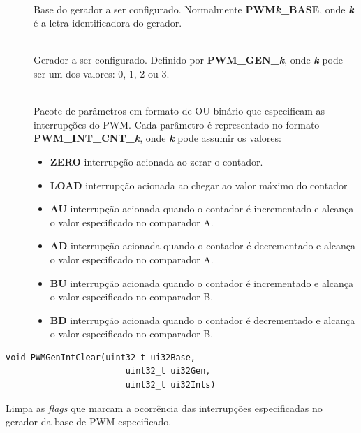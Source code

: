 \begin{description}
	\item []\hfill \\
	Base do gerador a ser configurado. Normalmente \textbf{PWM\emph{k}\_BASE}, onde \textbf{\emph{k}} é a letra identificadora do gerador.
	
	\item []\hfill \\
	Gerador a ser configurado. Definido por \textbf{PWM\_GEN\_\emph{k}}, onde \textbf{\emph{k}} pode ser um dos valores: 0, 1, 2 ou 3.
	
	\item []\hfill \\
	Pacote de parâmetros em formato de OU binário que especificam as interrupções do PWM. Cada parâmetro é representado no formato \textbf{PWM\_INT\_CNT\_\emph{k}}, onde \textbf{\emph{k}} pode assumir os valores:
	\begin{itemize}
		\item \textbf{ZERO} interrupção acionada ao zerar o contador.
		\item \textbf{LOAD} interrupção acionada ao chegar ao valor máximo do contador
		\item \textbf{AU} interrupção acionada quando o contador é incrementado e alcança o valor especificado no comparador A.
		\item \textbf{AD} interrupção acionada quando o contador é decrementado e alcança o valor especificado no comparador A.
		\item \textbf{BU} interrupção acionada quando o contador é incrementado e alcança o valor especificado no comparador B.
		\item \textbf{BD} interrupção acionada quando o contador é decrementado e alcança o valor especificado no comparador B.
	\end{itemize}
	
\end{description}

\begin{lstlisting}[style=funcao]
	void PWMGenIntClear(uint32_t ui32Base,
						uint32_t ui32Gen,
						uint32_t ui32Ints)
\end{lstlisting}

Limpa as \emph{flags} que marcam a ocorrência das interrupções especificadas no gerador da base de PWM especificado.

